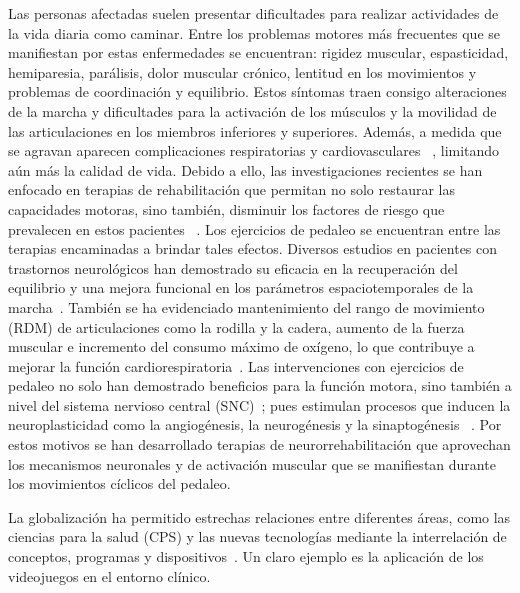 \begin{introduction}
    \vspace{5pt}
    Las personas afectadas suelen presentar dificultades para realizar actividades de la vida diaria como caminar. Entre los problemas motores más frecuentes que se manifiestan por estas enfermedades se encuentran: rigidez muscular, espasticidad, hemiparesia,
    parálisis, dolor muscular crónico, lentitud en los movimientos y problemas de coordinación y equilibrio. Estos síntomas traen consigo alteraciones de la marcha y dificultades para la activación de los músculos y la movilidad de las articulaciones en los
    miembros inferiores y superiores. Además, a medida que se agravan aparecen complicaciones respiratorias y cardiovasculares ~\cite{barbosa2015application, miner2020therapeutic}, limitando aún más la calidad de vida. Debido a ello, las investigaciones recientes se han enfocado en terapias de rehabilitación que permitan no solo restaurar las capacidades motoras, sino también, disminuir los factores de riesgo que prevalecen en estos pacientes ~\cite{barbosa2015application}. Los ejercicios de pedaleo se encuentran entre las terapias encaminadas a brindar tales efectos. Diversos estudios en pacientes con trastornos neurológicos han demostrado su eficacia en la recuperación del equilibrio y una mejora funcional en los parámetros espaciotemporales de la marcha~\cite{quiles2020lessons, el2021effect}. También se ha evidenciado mantenimiento del rango de movimiento (RDM) de articulaciones como la rodilla y la cadera, aumento de la fuerza muscular e incremento del consumo máximo de oxígeno, lo que contribuye a mejorar la función cardiorespiratoria~\cite{el2021effect, ashadi2016pengaruh}. Las intervenciones con ejercicios de pedaleo no solo han demostrado beneficios para la función motora, sino también a nivel del sistema nervioso central (SNC)~\cite{linder2019forced, alberts2011not}; pues estimulan procesos que inducen la neuroplasticidad como la angiogénesis, la neurogénesis y la sinaptogénesis ~\cite{linder2019forced, el2021effect}. Por estos motivos se han desarrollado terapias de neurorrehabilitación que aprovechan 
    los mecanismos neuronales y de activación muscular que se manifiestan durante los movimientos cíclicos del pedaleo. 
    
    \vspace{5pt}
    La globalización ha permitido estrechas relaciones entre diferentes áreas, como las ciencias para la salud (CPS) y las nuevas tecnologías 
    mediante la interrelación de conceptos, programas y dispositivos~\cite{federal2008older}. Un claro ejemplo es la aplicación de los videojuegos en el 
    entorno clínico.
    

\end{introduction}
